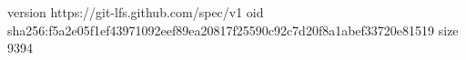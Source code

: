 version https://git-lfs.github.com/spec/v1
oid sha256:f5a2e05f1ef43971092eef89ea20817f25590c92c7d20f8a1abef33720e81519
size 9394
